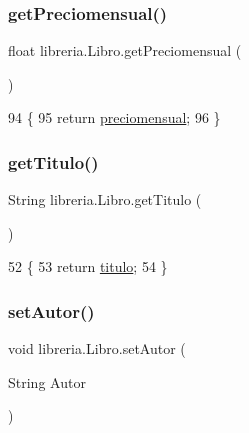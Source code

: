 \subsubsection{\texorpdfstring{get\+Preciomensual()}{getPreciomensual()}}
{\footnotesize\ttfamily float libreria.\+Libro.\+get\+Preciomensual (\begin{DoxyParamCaption}{ }\end{DoxyParamCaption})\hspace{0.3cm}{\ttfamily [inline]}}


\begin{DoxyCode}
94                                     \{
95         \textcolor{keywordflow}{return} \mbox{\hyperlink{classlibreria_1_1_libro_aa3ecf9746a1de3547b71c154ffbcbeb7}{preciomensual}};
96     \}
\end{DoxyCode}
\mbox{\label{classlibreria_1_1_libro_ac07542098ad57c5c5e1e608d4bf67ae8}} 
\subsubsection{\texorpdfstring{get\+Titulo()}{getTitulo()}}
{\footnotesize\ttfamily String libreria.\+Libro.\+get\+Titulo (\begin{DoxyParamCaption}{ }\end{DoxyParamCaption})\hspace{0.3cm}{\ttfamily [inline]}}


\begin{DoxyCode}
52                               \{
53         \textcolor{keywordflow}{return} \mbox{\hyperlink{classlibreria_1_1_libro_aa45a435366afb4759f59f6f4d86d0e3a}{titulo}};
54     \}
\end{DoxyCode}
\mbox{\label{classlibreria_1_1_libro_a0c49a8ce6e5ad49d281acaa5ad6eddbe}} 
\subsubsection{\texorpdfstring{set\+Autor()}{setAutor()}}
{\footnotesize\ttfamily void libreria.\+Libro.\+set\+Autor (\begin{DoxyParamCaption}\item[{String}]{Autor }\end{DoxyParamCaption})\hspace{0.3cm}{\ttfamily [inline]}}


